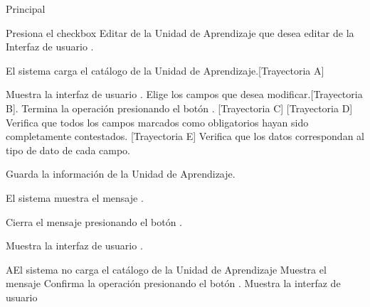 \begin{UCtrayectoria}{Principal}

    \UCpaso[\UCactor] Presiona el checkbox Editar de la Unidad de Aprendizaje que desea editar de la Interfaz de usuario  .

    \UCpaso El sistema carga el catálogo de la Unidad de Aprendizaje.[Trayectoria A]


    \UCpaso Muestra la interfaz de usuario .
    \UCpaso[\UCactor] Elige los campos que desea modificar.[Trayectoria B].
    \UCpaso[\UCactor] Termina la operación presionando el botón . [Trayectoria C] [Trayectoria D]
    \UCpaso Verifica que todos los campos marcados como obligatorios hayan sido completamente contestados. [Trayectoria E]
    \UCpaso Verifica que los datos correspondan al tipo de dato de cada campo.

    \UCpaso Guarda la información de la Unidad de Aprendizaje.

    \UCpaso El sistema muestra el mensaje .

    \UCpaso[\UCactor] Cierra el mensaje presionando el botón .

    \UCpaso Muestra la interfaz de usuario .
\end{UCtrayectoria}


\begin{comment}
\begin{UCtrayectoriaA}{A}{El sistema no encuentra ningún formulario para mostrar.}
	\UCpaso No encuentra ningún formulario para mostrar.
    \UCpaso El sistema muestra el mensaje \MSGref{MSG6}{Por el momento no se puede registrar la bibliografía}.
    \UCpaso[\UCactor] Cierra el mensaje presionando el botón \IUbutton{Aceptar}.
    \UCpaso Continua en el paso 1 de la trayectoria principal del \UCref{CU1}.
\end{UCtrayectoriaA}
\end{comment}


\begin{UCtrayectoriaA}{A}{El sistema no carga el catálogo de la Unidad de Aprendizaje}
	\UCpaso Muestra el mensaje 
	\UCpaso[\UCactor] Confirma la operación presionando el botón .
	 \UCpaso Muestra la interfaz de usuario 

\end{UCtrayectoriaA}

